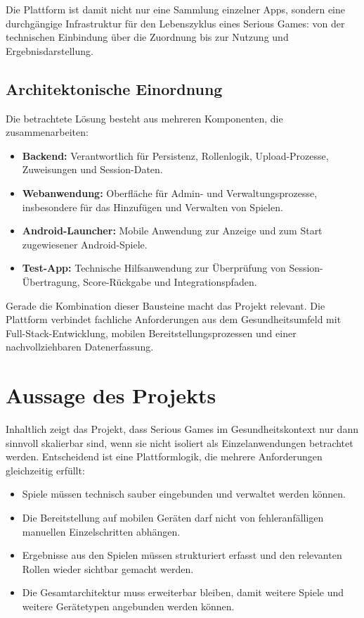 \documentclass[12pt,a4paper]{article}
\begin{document}
Die Plattform ist damit nicht nur eine Sammlung einzelner Apps, sondern eine durchgängige Infrastruktur für den Lebenszyklus eines Serious Games: von der technischen Einbindung über die Zuordnung bis zur Nutzung und Ergebnisdarstellung.

\subsection{Architektonische Einordnung}
Die betrachtete Lösung besteht aus mehreren Komponenten, die zusammenarbeiten:

\begin{itemize}[leftmargin=1.5em]
  \item \textbf{Backend:} Verantwortlich für Persistenz, Rollenlogik, Upload-Prozesse, Zuweisungen und Session-Daten.
  \item \textbf{Webanwendung:} Oberfläche für Admin- und Verwaltungsprozesse, insbesondere für das Hinzufügen und Verwalten von Spielen.
  \item \textbf{Android-Launcher:} Mobile Anwendung zur Anzeige und zum Start zugewiesener Android-Spiele.
  \item \textbf{Test-App:} Technische Hilfsanwendung zur Überprüfung von Session-Übertragung, Score-Rückgabe und Integrationspfaden.
\end{itemize}

Gerade die Kombination dieser Bausteine macht das Projekt relevant. Die Plattform verbindet fachliche Anforderungen aus dem Gesundheitsumfeld mit Full-Stack-Entwicklung, mobilen Bereitstellungsprozessen und einer nachvollziehbaren Datenerfassung.

\section{Aussage des Projekts}
Inhaltlich zeigt das Projekt, dass Serious Games im Gesundheitskontext nur dann sinnvoll skalierbar sind, wenn sie nicht isoliert als Einzelanwendungen betrachtet werden. Entscheidend ist eine Plattformlogik, die mehrere Anforderungen gleichzeitig erfüllt:

\begin{itemize}[leftmargin=1.5em]
  \item Spiele müssen technisch sauber eingebunden und verwaltet werden können.
  \item Die Bereitstellung auf mobilen Geräten darf nicht von fehleranfälligen manuellen Einzelschritten abhängen.
  \item Ergebnisse aus den Spielen müssen strukturiert erfasst und den relevanten Rollen wieder sichtbar gemacht werden.
  \item Die Gesamtarchitektur muss erweiterbar bleiben, damit weitere Spiele und weitere Gerätetypen angebunden werden können.
\end{itemize}
\end{document}
